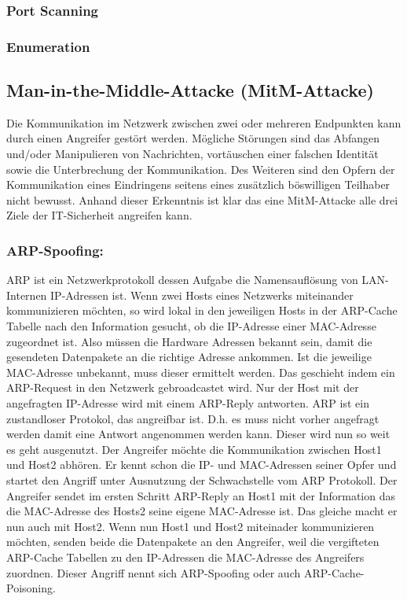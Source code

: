 \subsubsection{Port Scanning}



\subsubsection{Enumeration}

\subsection{Man-in-the-Middle-Attacke (MitM-Attacke)}
Die Kommunikation im Netzwerk zwischen zwei oder mehreren Endpunkten kann durch einen Angreifer gestört werden. Mögliche Störungen sind das Abfangen und/oder Manipulieren von Nachrichten, vortäuschen einer falschen Identität sowie die Unterbrechung der Kommunikation.\cite{ref_book_attack_1} Des Weiteren sind den Opfern der Kommunikation eines Eindringens seitens eines zusätzlich böswilligen Teilhaber nicht bewusst. Anhand  dieser Erkenntnis ist klar das eine MitM-Attacke alle drei Ziele der IT-Sicherheit angreifen kann. \cite{ref_ieee_attack_8}\par

\subsubsection{ARP-Spoofing:}
ARP ist ein Netzwerkprotokoll dessen Aufgabe die Namensauflösung von LAN-Internen IP-Adressen ist. Wenn zwei Hosts eines Netzwerks miteinander kommunizieren möchten, so wird lokal in den jeweiligen Hosts in der ARP-Cache Tabelle nach den Information gesucht, ob die IP-Adresse einer MAC-Adresse zugeordnet ist. Also müssen die Hardware Adressen bekannt sein, damit die gesendeten Datenpakete an die richtige Adresse ankommen.\cite{ref_ieee_attack_8}\cite{ref_url11} Ist die jeweilige MAC-Adresse unbekannt, muss dieser ermittelt werden. Das geschieht indem ein ARP-Request in den Netzwerk gebroadcastet wird. Nur der Host mit der angefragten IP-Adresse wird mit einem ARP-Reply antworten. ARP ist ein zustandloser Protokol, das angreifbar ist. D.h. es muss nicht vorher angefragt werden damit eine Antwort angenommen werden kann. Dieser wird nun so weit es geht ausgenutzt. Der Angreifer möchte die Kommunikation zwischen Host1 und Host2 abhören. Er kennt schon die IP- und MAC-Adressen seiner Opfer und startet den Angriff unter Ausnutzung der Schwachstelle vom ARP Protokoll. Der Angreifer sendet im ersten Schritt ARP-Reply an Host1 mit der Information das die MAC-Adresse des Hosts2 seine eigene MAC-Adresse ist. Das gleiche macht er nun auch mit Host2. Wenn nun Host1 und Host2 miteinader kommunizieren möchten, senden beide die Datenpakete an den Angreifer, weil die vergifteten ARP-Cache Tabellen zu den IP-Adressen die MAC-Adresse des Angreifers zuordnen. Dieser Angriff nennt sich ARP-Spoofing oder auch ARP-Cache-Poisoning.\cite{ref_ieee_attack_8} \cite{ref_url11} \par

